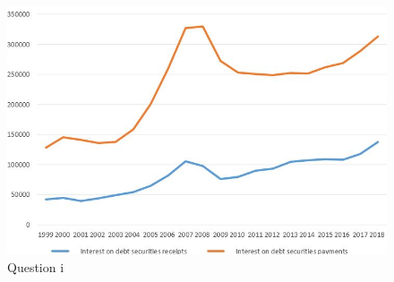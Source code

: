 \documentclass[	11pt, ]{fphw}
\begin{document}
\begin{figure}[h]
\centering 
\includegraphics[scale=0.6]{ass2esi2.JPG} 
\caption{Question i} 
\label{4}
\end{figure}
\end{document}

